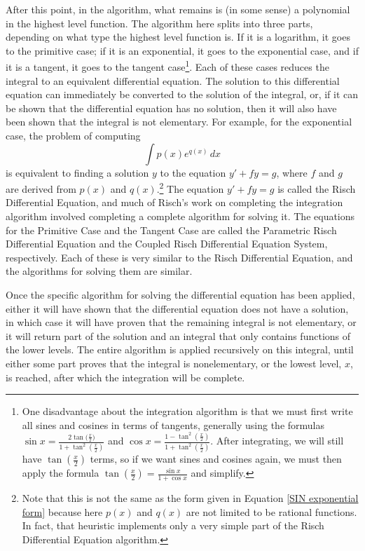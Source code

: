 After this point, in the algorithm, what remains is (in some sense) a
polynomial in the highest level function.  The algorithm here splits
into three parts, depending on what type the highest level function is.  If it
is a logarithm, it goes to the primitive case; if it is an exponential,
it goes to the exponential case, and if it is a tangent, it goes to the
tangent case\footnote{One disadvantage about the \gls{integration} algorithm
is that we must first write all sines and cosines in terms of tangents,
generally using the formulas $\sin{x} = \frac{2\tan{(\frac{x}{2}})}{1 +
\tan^2{(\frac{x}{2})}}$ and $\cos{x} = \frac{1 -
\tan^2{(\frac{x}{2})}}{1 + \tan^2{(\frac{x}{2})}}$.  After integrating,
we will still have $\tan{(\frac{x}{2})}$ terms, so if we want sines and
cosines again, we must then apply the formula $\tan{(\frac{x}{2})} =
\frac{\sin{x}}{1 + \cos{x}}$ and simplify.}.  Each of these cases
reduces the integral to an equivalent differential equation.  The
solution to this differential equation can immediately be converted to the
solution of the integral, or, if it can be shown that the differential
equation has no solution, then it will also have been shown that the
integral is not \gls{elementary}.  For example, for the exponential
case, the problem of computing
\begin{equation}
\label{exponential case}
\int{p(x)e^{q(x)}\,dx}
\end{equation}
is equivalent to finding a solution $y$ to the equation $y' + fy = g$,
where $f$ and $g$ are derived from $p(x)$ and $q(x)$.\footnote{Note that
this is not the same as the form given in Equation \ref{SIN exponential
form} because here $p(x)$ and $q(x)$ are not limited to be
\glspl{rational function}.  In fact, that heuristic implements only a
very simple part of the Risch Differential Equation algorithm.}  The
equation $y' + fy = g$ is called the Risch Differential Equation, and
much of Risch's work on completing the \gls{integration} algorithm
involved completing a complete algorithm for solving it.  The equations
for the Primitive Case and the Tangent Case are called the Parametric
Risch Differential Equation and the Coupled Risch Differential Equation
System, respectively.  Each of these is very similar to the Risch
Differential Equation, and the algorithms for solving them are similar.

Once the specific algorithm for solving the differential equation has
been applied, either it will have shown that the differential equation
does not have a solution, in which case it will have proven that the
remaining integral is not \gls{elementary}, or it will return part of
the solution and an integral that only contains functions of the lower
levels.  The entire algorithm is applied recursively on this integral,
until either some part proves that the integral is nonelementary, or the
lowest level, $x$, is reached, after which the \gls{integration} will be
complete.

